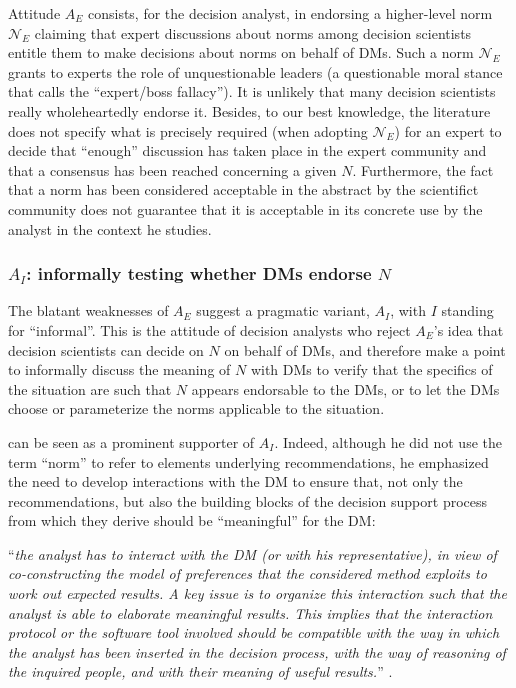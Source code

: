 \documentclass[preprint, french, english, 11pt, authoryear]{elsarticle}%
\newcommand{\protectforpdf}[1]{\texorpdfstring{\ensuremath{#1}}{#1}}
\begin{document}
Attitude $A_E$ consists, for the decision analyst, in endorsing a higher-level norm $\mathscr{N}_E$ claiming that expert discussions about norms among decision scientists entitle them to make decisions about norms on behalf of \acp{DM}. Such a norm $\mathscr{N}_E$ grants to experts the role of unquestionable leaders (a questionable moral stance that \citet{estlund_democratic_2009} calls the ``expert/boss fallacy''). It is unlikely that many decision scientists really wholeheartedly endorse it. Besides, to our best knowledge, the literature does not specify what is precisely required (when adopting  $\mathscr{N}_E$) for an expert to decide that “enough” discussion has taken place in the expert community and that a consensus has been reached concerning a given $N$. Furthermore, the fact that a norm has been considered acceptable in the abstract by the scientifict community does not guarantee that it is acceptable in its concrete use by the analyst in the context he studies.

\subsubsection{\texorpdfstring{$A_I$}{AI}: informally testing whether \acp{DM} endorse \protectforpdf{N}}
The blatant weaknesses of $A_E$ suggest a pragmatic variant, $A_I$, with $I$ standing for “informal”. This is the attitude of decision analysts who reject $A_E$'s idea that decision scientists can decide on $N$ on behalf of \acp{DM}, and therefore make a point to informally discuss the meaning of $N$ with \acp{DM} to verify that the specifics of the situation are such that $N$ appears endorsable to the \acp{DM}, or to let the \acp{DM} choose or parameterize the norms applicable to the situation.

\citet{roy_multicriteria_1996} can be seen as a prominent supporter of $A_I$. Indeed, although he did not use the term “norm” to refer to elements underlying recommendations, he emphasized the need to develop interactions with the \ac{DM} to ensure that, not only the recommendations, but also the building blocks of the decision support process from which they derive should be ``meaningful'' for the \ac{DM}:
\begin{addmargin}[3em]{3em}
 “\emph{the analyst has to interact
with the \ac{DM} (or with his representative), in view of co-constructing the model of preferences that the considered method exploits to work out expected results. A key issue is to organize this interaction such that the analyst is able to
elaborate meaningful results. This implies that the interaction protocol or the
software tool involved should be compatible with the way in which the analyst has
been inserted in the decision process, with the way of reasoning of the inquired
people, and with their meaning of useful results.}” \citep[pp. 84--85]{roy_questions_2013}.
\end{addmargin}
\end{document}
